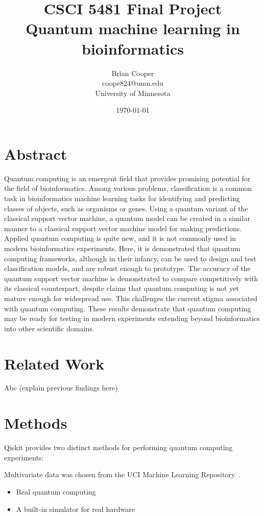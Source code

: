 \documentclass{article}
\title{%
  CSCI 5481 Final Project \\
  \large Quantum machine learning in bioinformatics
}
\author{Brian Cooper \\ coope824@umn.edu \\ University of Minnesota}
\date{\today}
\begin{document}
\maketitle

\section{Abstract}
  Quantum computing is an emergent field that provides promising potential for the field of bioinformatics. Among various problems, classification is a common task in bioinformatics machine learning tasks for identifying and predicting classes of objects, such as organisms or genes. Using a quantum variant of the classical support vector machine, a quantum model can be created in a similar manner to a classical support vector machine model for making predictions. Applied quantum computing is quite new, and it is not commonly used in modern bioinformatics experiments. Here, it is demonstrated that quantum computing frameworks, although in their infancy, can be used to design and test classification models, and are robust enough to prototype. The accuracy of the quantum support vector machine is demonstrated to compare competitively with its classical counterpart, despite claims that quantum computing is not yet mature enough for widespread use. This challenges the current stigma associated with quantum computing. These results demonstrate that quantum computing may be ready for testing in modern experiments extending beyond bioinformatics into other scientific domains.

\section{Related Work}
  Abc (explain previous findings here)

\section{Methods}
  Qiskit provides two distinct methods for performing quantum computing experiments:

  Multivariate data was chosen from the UCI Machine Learning Repository~\cite{}.

  \begin{itemize}
    \item{Real quantum computing}
    \item{A built-in simulator for real hardware}
  \end{itemize}
\end{document}
